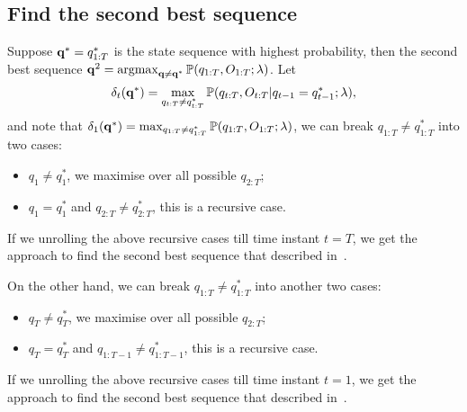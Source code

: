 \subsection{Find the second best sequence}
\label{ssec:2ndbest}

Suppose $\mathbf{q}^* = q_{1:T}^*$ is the state sequence with highest probability,
then the second best sequence $\mathbf{q}^2 = \operatorname*{argmax}_{\mathbf{q} \ne \mathbf{q}^*} \mathbb{P}(q_{1:T}, O_{1:T}; \lambda)$.
Let 
\begin{equation}
\delta_t(\mathbf{q}^*) = \max_{q_{t:T} \ne q_{t:T}^*} \mathbb{P}(q_{t:T}, O_{t:T} |q_{t-1} = q_{t-1}^*; \lambda),
\end{equation}
and note that $\delta_1(\mathbf{q}^*) = \max_{q_{1:T} \ne q_{1:T}^*} \mathbb{P}(q_{1:T}, O_{1:T}; \lambda)$, 
we can break $q_{1:T} \ne q_{1:T}^*$ into two cases:
\begin{itemize}
\item $q_1 \ne q_1^*$, we maximise over all possible $q_{2:T}$;
\item $q_1 = q_1^*$ and $q_{2:T} \ne q_{2:T}^*$, this is a recursive case.
\end{itemize}
If we unrolling the above recursive cases till time instant $t = T$, we get the approach to find the second best sequence 
that described in~\cite{nilsson2001sequentially}.

On the other hand, we can break $q_{1:T} \ne q_{1:T}^*$ into another two cases:
\begin{itemize}
\item $q_T \ne q_T^*$, we maximise over all possible $q_{2:T}$;
\item $q_T = q_T^*$ and $q_{1:T-1} \ne q_{1:T-1}^*$, this is a recursive case.
\end{itemize}
If we unrolling the above recursive cases till time instant $t = 1$, we get the approach to find the second best sequence 
that described in~\cite{seshadri1994list}.

